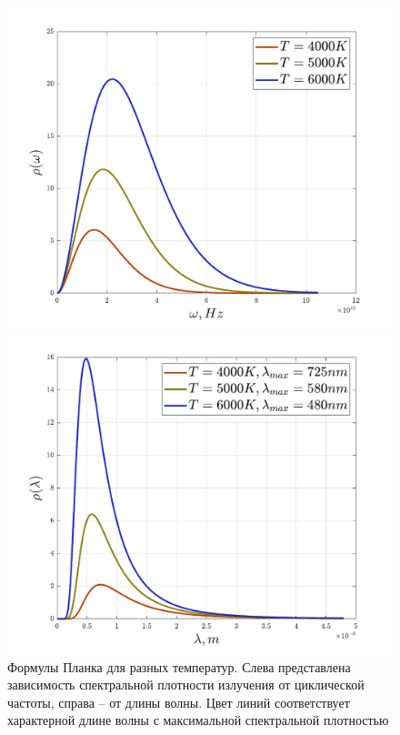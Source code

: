 \documentclass[12pt]{article}
\begin{document}
\begin{figure}[h]
    \centering
    \begin{minipage}{0.5\textwidth}
        \centering
        \includegraphics[width=1.0\textwidth]{Seminar_01/pics/pic_04_left.pdf}
    \end{minipage}\hfill
    \begin{minipage}{0.5\textwidth}
        \centering
        \includegraphics[width=1.0\textwidth]{Seminar_01/pics/pic_04_right.pdf}
    \end{minipage}
    \caption{Формулы Планка для разных температур. Слева представлена зависимость спектральной плотности излучения от циклической частоты, справа -- от длины волны. Цвет линий соответствует характерной длине волны с максимальной спектральной плотностью}
    \label{fig:sem_01_plank_func}
\end{figure}
\end{document}

